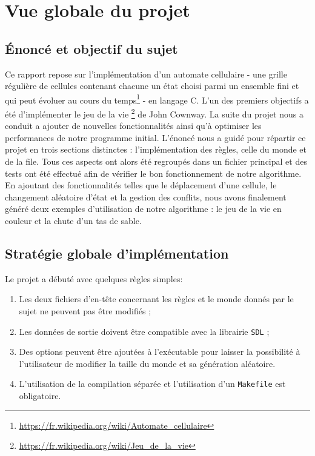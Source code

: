 \chapter{Vue globale du projet}
\section{Énoncé et objectif du sujet}

Ce rapport repose sur l'implémentation d'un automate cellulaire - une grille régulière de cellules contenant chacune un état choisi parmi un ensemble fini et qui peut évoluer au cours du temps\footnote{\url{https://fr.wikipedia.org/wiki/Automate_cellulaire}} - en langage C. L'un des premiers objectifs a été d'implémenter le jeu de la vie \footnote{\url{https://fr.wikipedia.org/wiki/Jeu_de_la_vie}} de John Cownway. La suite du projet nous a conduit a ajouter de nouvelles fonctionnalités ainsi qu'à optimiser les performances de notre programme initial. L'énoncé nous a guidé pour répartir ce projet en trois sections distinctes : l'implémentation des règles, celle du monde et de la file. Tous ces aspects ont alors été regroupés dans un fichier principal et des tests ont été effectué afin de vérifier le bon fonctionnement de notre algorithme. En ajoutant des fonctionnalités telles que le déplacement d'une cellule, le changement aléatoire d'état et la gestion des conflits, nous avons finalement généré deux exemples d'utilisation de notre algorithme : le jeu de la vie en couleur et la chute d'un tas de sable.

\section{Stratégie globale d'implémentation}

Le projet a débuté avec quelques règles simples:
\begin{enumerate}
    \item Les deux fichiers d'en-tête concernant les règles et le monde donnés par le sujet ne peuvent pas être modifiés ;
    \item Les données de sortie doivent être compatible avec la librairie \texttt{SDL} ;
    \item Des options peuvent être ajoutées à l'exécutable pour laisser la possibilité à l'utilisateur de modifier la taille du monde et sa génération aléatoire.
    \item L'utilisation de la compilation séparée et l'utilisation d'un \texttt{Makefile} est obligatoire.
\end{enumerate}


